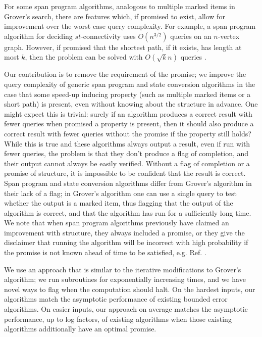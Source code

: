 \documentclass[cleveref, autoref, thm-restate,11pt]{article}
\theoremstyle{definition}
\begin{document}
For some span program algorithms, analogous to multiple marked items in
Grover's search, there are features which, if promised to exist, allow for
improvement over the worst case query complexity. For example, a span program
algorithm for deciding $st$-connectivity uses $O\left(n^{3/2}\right)$ queries on an
$n$-vertex graph. However, if \textrm{promised} that the shortest path, if it exists,
has length at most $k$, then the problem can be solved with $O(\sqrt
{k}n)$ queries \cite{belovsSpanProgramsQuantum2012}.

Our contribution is to remove the requirement of the promise; we improve
the query complexity of generic span program and state conversion algorithms in the
case that some speed-up inducing property (such as multiple marked items or a 
short path) is present, even without knowing about the structure in advance.
One might expect this is
trivial: surely if an algorithm produces a correct result with fewer queries
when promised a property is present, then it should also produce a correct
result with fewer queries without the promise if the property still holds?
While this is true and these algorithms always output a result, even if run
with fewer queries, the problem is that they don't produce a flag of
completion, and their output cannot always be easily verified. Without a flag of
completion or a promise of structure, it is impossible to be confident that
the result is correct. Span program and state conversion algorithms differ
from Grover's algorithm in their lack of a flag; in Grover's algorithm one can
use a single query to test whether the output is a marked item, thus flagging
that the output of the algorithm is correct, and that the algorithm has run
for a sufficiently long time. We note that when span program algorithms
previously have claimed an improvement with structure, they always included a
promise, or they give the disclaimer that running the algorithm will be
incorrect with high probability if the promise is not known ahead of time to
be satisfied, e.g. Ref. \cite[App. C.3]{cadeTimeSpaceEfficient2018}.


We use an approach that is similar to the
iterative modifications to Grover's algorithm; we run subroutines for
exponentially increasing times, and we have novel ways to flag when the
computation should halt. On the hardest inputs, our algorithms 
match the asymptotic performance of existing bounded error algorithms. On easier inputs, our approach on average matches the asymptotic performance, up to log factors, of existing algorithms when
those existing algorithms additionally have an optimal promise.
\end{document}
